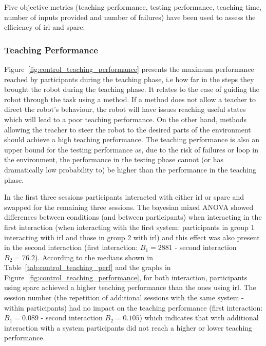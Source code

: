 Five objective metrics (teaching performance, testing performance, teaching time, number of inputs provided and number of failures) have been used to assess the efficiency of \gls{irl} and \gls{sparc}. 

\subsubsection{Teaching Performance}

Figure~\ref{fig:control_teaching_performance} presents the maximum performance reached by participants during the teaching phase, i.e how far in the steps they brought the robot during the teaching phase. It relates to the ease of guiding the robot through the task using a method. If a method does not allow a teacher to direct the robot's behaviour, the robot will have issues reaching useful states which will lead to a poor teaching performance. On the other hand, methods allowing the teacher to steer the robot to the desired parts of the environment should achieve a high teaching performance. The teaching performance is also an upper bound for the testing performance as, due to the risk of failures or loop in the environment, the performance in the testing phase cannot (or has dramatically low probability to) be higher than the performance in the teaching phase.

In the first three sessions participants interacted with either \gls{irl} or \gls{sparc} and swapped for the remaining three sessions. The bayesian mixed ANOVA showed differences between conditions (and between participants) when interacting in the first interaction (when interacting with the first system: participants in group 1 interacting with \gls{irl} and those in group 2 with \gls{irl}) and this effect was also present in the second interaction (first interaction: $B_1=2881$ - second interaction $B_2 = 76.2$). According to the medians shown in Table~\ref{tab:control_teaching_perf} and the graphs in Figure~\ref{fig:control_teaching_performance}, for both interaction, participants using \gls{sparc} achieved a higher teaching performance than the ones using \gls{irl}. The session number (the repetition of additional sessions with the same system - within participants) had no impact on the teaching performance (first interaction: $B_1=0.089$ - second interaction $B_2=0.105$) which indicates that with additional interaction with a system participants did not reach a higher or lower teaching performance.


